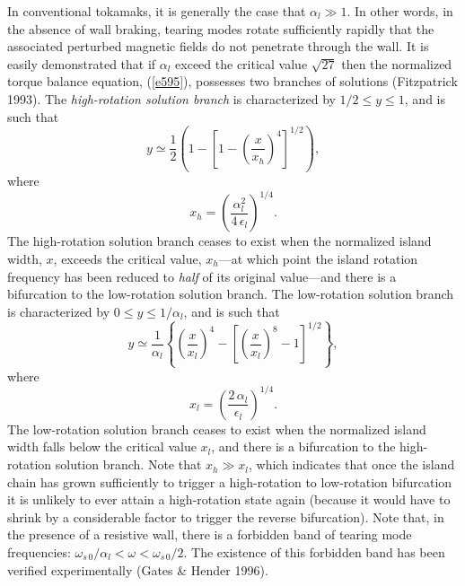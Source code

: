 \documentclass[notitlepage,12pt]{article}
\begin{document}
In conventional tokamaks, it is generally the case that $\alpha_l\gg 1$. In other words, in the absence of wall braking,
tearing modes rotate sufficiently rapidly that the associated perturbed magnetic fields do not
penetrate through the wall. It is easily demonstrated that if $\alpha_l$ exceed the critical value $\sqrt{27}$ then the
normalized torque balance equation, (\ref{e595}), possesses two branches of solutions (Fitzpatrick 1993). The
{\em high-rotation solution branch}\/ is characterized by $1/2\leq y\leq 1$, and is such that
\begin{equation}
y \simeq \frac{1}{2}\left(1-\left[1-\left(\frac{x}{x_h}\right)^4\right]^{1/2}\right),
\end{equation}
where
\begin{equation}
x_h =\left(\frac{\alpha_l^2}{4\,\epsilon_l}\right)^{1/4}.
\end{equation}
The high-rotation solution branch ceases to exist when the normalized island width, $x$, exceeds the
critical value, $x_h$---at which point the island rotation frequency has been reduced to {\em half}\/ of its original value---and
there is a bifurcation to the low-rotation solution branch. 
The low-rotation solution branch is characterized by $0\leq y\leq 1/\alpha_l$, and is such that
\begin{equation}
y \simeq \frac{1}{\alpha_l}\left\{\left(\frac{x}{x_l}\right)^4-\left[\left(\frac{x}{x_l}\right)^8-1\right]^{1/2}\right\},
\end{equation}
where
\begin{equation}
x_l=\left(\frac{2\,\alpha_l}{\epsilon_l}\right)^{1/4}.
\end{equation}
The low-rotation solution branch ceases to exist when the normalized island width falls below the critical value
$x_l$, and there is a bifurcation to the high-rotation solution branch. Note that $x_h\gg x_l$, which indicates that once the
island chain has grown sufficiently to trigger a high-rotation to low-rotation bifurcation it is unlikely to ever attain a
high-rotation state again (because it would have to shrink by a considerable factor to trigger the reverse bifurcation). 
Note that, in the presence of a resistive wall, there is a forbidden band of tearing mode frequencies: $\omega_{s\,0}/\alpha_l < \omega< \omega_{s\,0}/2$. The existence of this forbidden band has been verified experimentally (Gates \& Hender 1996).
\end{document}
